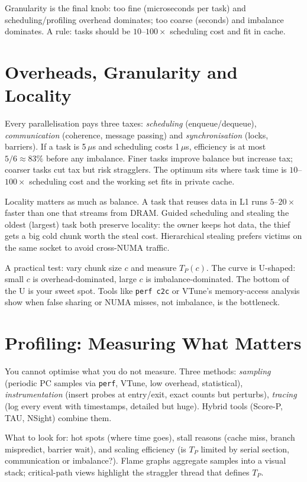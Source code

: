 Granularity is the final knob: too fine (microseconds per task) and scheduling/profiling overhead dominates; too coarse (seconds) and imbalance dominates. A rule: tasks should be $10$--$100\times$ scheduling cost and fit in cache.


\section{Overheads, Granularity and Locality}\label{sec:overheads}
Every parallelisation pays three taxes: \emph{scheduling} (enqueue/dequeue), \emph{communication} (coherence, message passing) and \emph{synchronisation} (locks, barriers). If a task is 5\,$\mu$s and scheduling costs 1\,$\mu$s, efficiency is at most $5/6\approx83\%$ before any imbalance. Finer tasks improve balance but increase tax; coarser tasks cut tax but risk stragglers. The optimum sits where task time is $10$--$100\times$ scheduling cost and the working set fits in private cache.

Locality matters as much as balance. A task that reuses data in L1 runs $5$--$20\times$ faster than one that streams from DRAM. Guided scheduling and stealing the oldest (largest) task both preserve locality: the owner keeps hot data, the thief gets a big cold chunk worth the steal cost. Hierarchical stealing prefers victims on the same socket to avoid cross-NUMA traffic.

A practical test: vary chunk size $c$ and measure $T_P(c)$. The curve is U-shaped: small $c$ is overhead-dominated, large $c$ is imbalance-dominated. The bottom of the U is your sweet spot. Tools like \texttt{perf c2c} or VTune's memory-access analysis show when false sharing or NUMA misses, not imbalance, is the bottleneck.

\section{Profiling: Measuring What Matters}\label{sec:profiling}
You cannot optimise what you do not measure. Three methods: \emph{sampling} (periodic PC samples via \texttt{perf}, VTune, low overhead, statistical), \emph{instrumentation} (insert probes at entry/exit, exact counts but perturbs), \emph{tracing} (log every event with timestamps, detailed but huge). Hybrid tools (Score-P, TAU, NSight) combine them.

What to look for: hot spots (where time goes), stall reasons (cache miss, branch mispredict, barrier wait), and scaling efficiency (is $T_P$ limited by serial section, communication or imbalance?). Flame graphs aggregate samples into a visual stack; critical-path views highlight the straggler thread that defines $T_P$.

